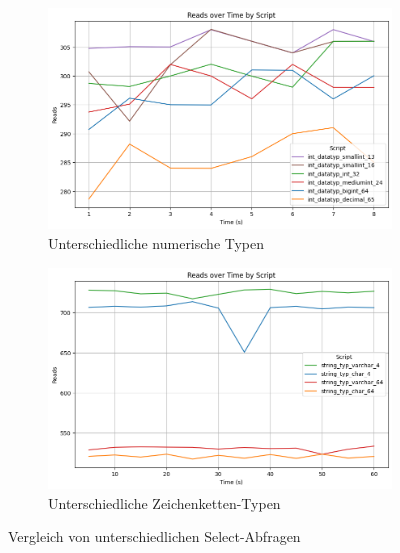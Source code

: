 \vspace{-18pt}
\begin{figure}[H]
    \centering
    \begin{subfigure}[t]{0.48\textwidth}
        \centering
        \includegraphics[width=\textwidth]{PNGs/Script/Data_Types/Smaller/number-type/Reads}
        \caption{Unterschiedliche numerische Typen}
        \label{data-types-smaller-number-type-reads}
    \end{subfigure}
    \hfill
    \begin{subfigure}[t]{0.48\textwidth}
        \centering
        \includegraphics[width=\textwidth]{PNGs/Script/Data_Types/Smaller/string-type/Reads}
        \caption{Unterschiedliche Zeichenketten-Typen}
        \label{fig:data-types-smaller-string-type-reads}
    \end{subfigure}
    \caption{Vergleich von unterschiedlichen Select-Abfragen}
\end{figure}
\vspace{-20pt}

